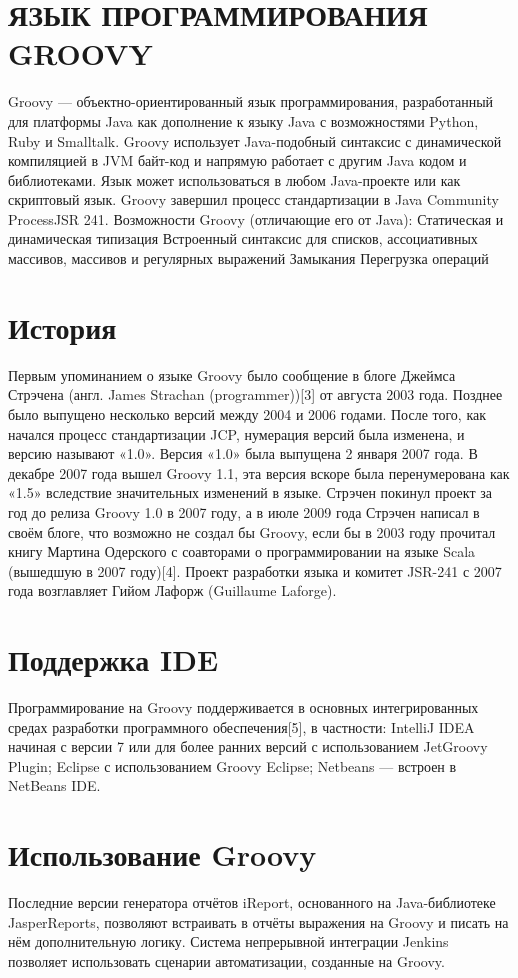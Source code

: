 \documentclass[14pt,article]{scrartcl}
\begin{document}


\section*{ЯЗЫК ПРОГРАММИРОВАНИЯ GROOVY}
\onehalfspacing
Groovy — объектно-ориентированный язык программирования, разработанный для платформы Java как дополнение к языку Java с возможностями Python, Ruby и Smalltalk.
Groovy использует Java-подобный синтаксис с динамической компиляцией в JVM байт-код и напрямую работает с другим Java кодом и библиотеками. Язык может использоваться в любом Java-проекте или как скриптовый язык.
Groovy завершил процесс стандартизации в Java Community ProcessJSR 241.
Возможности Groovy (отличающие его от Java):
Статическая и динамическая типизация
Встроенный синтаксис для списков, ассоциативных массивов, массивов и регулярных выражений
Замыкания
Перегрузка операций
\section*{История}
Первым упоминанием о языке Groovy было сообщение в блоге Джеймса Стрэчена (англ. James Strachan (programmer))[3] от августа 2003 года. Позднее было выпущено несколько версий между 2004 и 2006 годами. После того, как начался процесс стандартизации JCP, нумерация версий была изменена, и версию называют «1.0». Версия «1.0» была выпущена 2 января 2007 года. В декабре 2007 года вышел Groovy 1.1, эта версия вскоре была перенумерована как «1.5» вследствие значительных изменений в языке.
Стрэчен покинул проект за год до релиза Groovy 1.0 в 2007 году, а в июле 2009 года Стрэчен написал в своём блоге, что возможно не создал бы Groovy, если бы в 2003 году прочитал книгу Мартина Одерского с соавторами о программировании на языке Scala (вышедшую в 2007 году)[4].
Проект разработки языка и комитет JSR-241 с 2007 года возглавляет Гийом Лафорж (Guillaume Laforge).
\section*{Поддержка IDE}
Программирование на Groovy поддерживается в основных интегрированных средах разработки программного обеспечения[5], в частности:
IntelliJ IDEA начиная с версии 7 или для более ранних версий с использованием JetGroovy Plugin;
Eclipse с использованием Groovy Eclipse;
Netbeans — встроен в NetBeans IDE.
\section*{Использование Groovy}
Последние версии генератора отчётов iReport, основанного на Java-библиотеке JasperReports, позволяют встраивать в отчёты выражения на Groovy и писать на нём дополнительную логику.
Система непрерывной интеграции Jenkins позволяет использовать сценарии автоматизации, созданные на Groovy.
\end{document}
